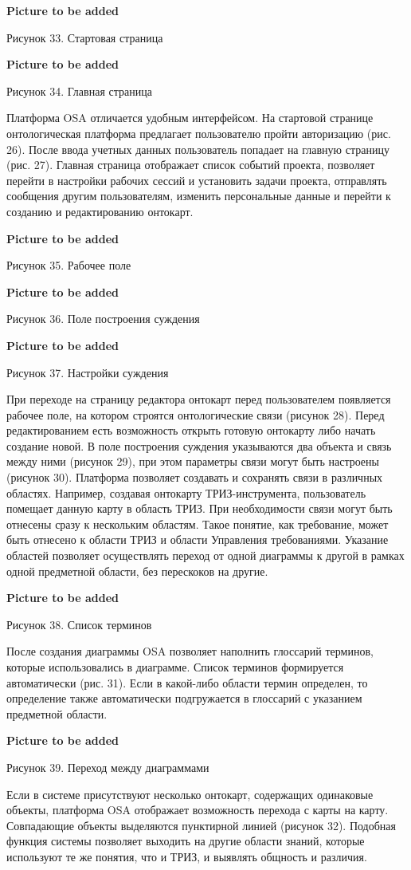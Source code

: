 \documentclass[11pt,a4paper]{article}
\newcommand{\addpicture}{\textbf{Picture to be added}\par}
\begin{document}
\begin{center}
  \addpicture
  Рисунок 33. Стартовая страница
\end{center}
\begin{center}
  \addpicture
  Рисунок 34. Главная страница
\end{center}
Платформа OSA отличается удобным интерфейсом. На стартовой странице
онтологическая платформа предлагает пользователю пройти авторизацию (рис. 26).
После ввода учетных данных пользователь попадает на главную страницу
(рис. 27).  Главная страница отображает список событий проекта, позволяет
перейти в настройки рабочих сессий и установить задачи проекта, отправлять
сообщения другим пользователям, изменить персональные данные и перейти к
созданию и редактированию онтокарт.
\begin{center}
  \addpicture
  Рисунок 35. Рабочее поле
\end{center}
\begin{center}
  \addpicture
  Рисунок 36. Поле построения суждения
\end{center}
\begin{center}
  \addpicture
  Рисунок 37. Настройки суждения
\end{center}
При переходе на страницу редактора онтокарт перед пользователем появляется
рабочее поле, на котором строятся онтологические связи (рисунок 28). Перед
редактированием есть возможность открыть готовую онтокарту либо начать
создание новой. В поле построения суждения указываются два объекта и связь
между ними (рисунок 29), при этом параметры связи могут быть настроены
(рисунок 30).  Платформа позволяет создавать и сохранять связи в различных
областях. Например, создавая онтокарту ТРИЗ-инструмента, пользователь помещает
данную карту в область ТРИЗ. При необходимости связи могут быть отнесены сразу
к нескольким областям. Такое понятие, как требование, может быть отнесено к
области ТРИЗ и области Управления требованиями. Указание областей позволяет
осуществлять переход от одной диаграммы к другой в рамках одной предметной
области, без перескоков на другие.
\begin{center}
  \addpicture
  Рисунок 38. Список терминов
\end{center}
После создания диаграммы OSA позволяет наполнить глоссарий терминов, которые
использовались в диаграмме. Список терминов формируется автоматически
(рис. 31).  Если в какой-либо области термин определен, то определение также
автоматически подгружается в глоссарий с указанием предметной области.
\begin{center}
  \addpicture
  Рисунок 39. Переход между диаграммами
\end{center}
Если в системе присутствуют несколько онтокарт, содержащих одинаковые объекты,
платформа OSA отображает возможность перехода с карты на карту. Совпадающие
объекты выделяются пунктирной линией (рисунок 32). Подобная функция системы
позволяет выходить на другие области знаний, которые используют те же понятия,
что и ТРИЗ, и выявлять общность и различия.
\end{document}

